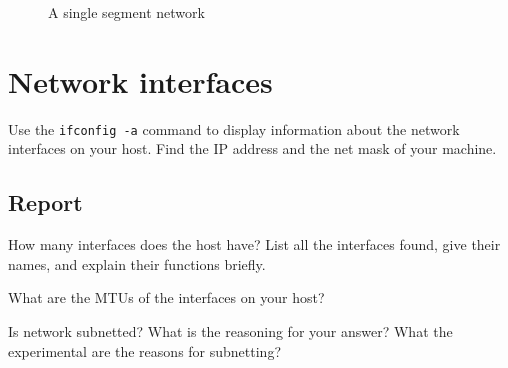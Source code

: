 \documentclass{../UTNetLab}
\begin{document}
\begin{center}
\begin{minipage}{0.48\textwidth}
\begin{flushright}
                \begin{figure}[H]
                    \centering
                    \caption{A single segment network}        
                \end{figure}
            \end{flushright}
        \end{minipage}
    \end{center}

\section{Network interfaces}
    Use the \lstinline{ifconfig -a} command to display information about the network interfaces on your host.
    Find the IP address and the net mask of your machine.
    \subsection*{Report}

    How many interfaces does the host have?
    List all the interfaces found, give their names, and explain their functions briefly.

    What are the MTUs of the interfaces on your host?

    Is network subnetted?
    What is the reasoning for your answer? What the experimental are the reasons for subnetting?
\end{document}
